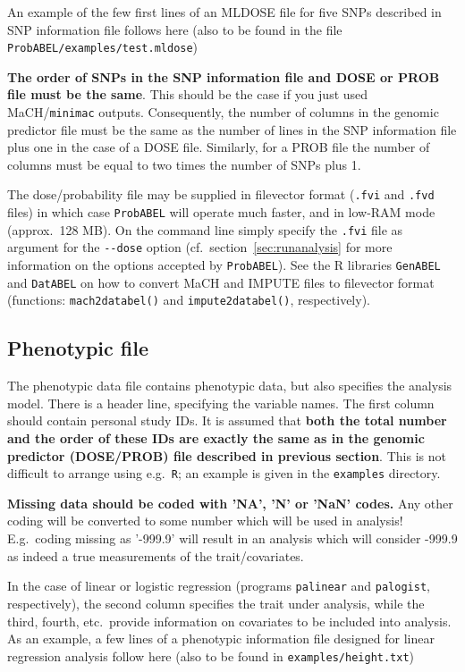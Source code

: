 \documentclass[12pt,a4paper]{article}
\newcommand{\GA}{\texttt{GenABEL}}
\newcommand{\DA}{\texttt{DatABEL}}
\begin{document}
An example of the few first lines of an MLDOSE file for
five SNPs described in SNP information file follows here (also
to be found in the file \texttt{ProbABEL/examples/test.mldose})




\textbf{The order of SNPs in the SNP information file and DOSE or PROB
  file must be the same}. This should be the case if you just used
MaCH/\texttt{minimac} outputs.
Consequently, the number of columns in the genomic predictor file
must be the same as the number of lines in the SNP information file
plus one in the case of a DOSE file. Similarly, for a PROB file the
number of columns must be equal to two times the number of SNPs plus
1.

The dose/probability file may be supplied in filevector format
(\texttt{.fvi} and \texttt{.fvd} files) in which case
\texttt{ProbABEL} will operate much faster, and in low-RAM mode
(approx.~128 MB). On the command line simply specify the \texttt{.fvi}
file as argument for the \lstinline{--dose} option
(cf.~section~\ref{sec:runanalysis} for more information on the options
accepted by \texttt{ProbABEL}). See the R libraries \GA{} and
\DA{} on how to convert MaCH and IMPUTE files to
filevector format (functions: \texttt{mach2databel()} and
\texttt{impute2databel()}, respectively).


\subsection{Phenotypic file}
\label{ssec:phenoin}

The phenotypic data file contains phenotypic data, but also specifies
the analysis model. There is a header line, specifying the variable
names.  The first column should contain personal study IDs. It is
assumed that \textbf{both the total number and the order of these IDs
  are exactly the same as in the genomic predictor (DOSE/PROB) file
  described in previous section}. This is not difficult to arrange
using e.g.~\texttt{R}; an example is given in the \texttt{examples}
directory.

\textbf{Missing data should be coded with 'NA', 'N' or 'NaN' codes.} Any
other coding will be converted to some number which will be used in
analysis! E.g.~coding missing as '-999.9' will result in an analysis which
will consider -999.9 as indeed a true measurements of the trait/covariates.

In the case of linear or logistic regression (programs
\texttt{palinear} and \texttt{palogist}, respectively), the second
column specifies the trait under analysis, while the third, fourth,
etc.~provide information on covariates to be included into analysis.
As an example, a few lines of a phenotypic information file designed
for linear regression analysis follow here (also to be found in
\texttt{examples/height.txt})
\end{document}
